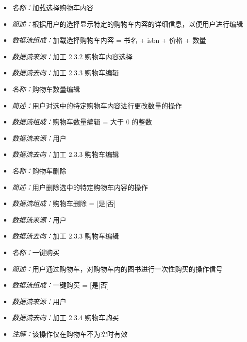 \vspace{-1mm}

\begin{itemize}
	\item \textit{名称：}加载选择购物车内容
	\item \textit{简述：}根据用户的选择显示特定的购物车内容的详细信息，以便用户进行编辑
	\item \textit{数据流组成：}加载选择购物车内容 = 书名 + isbn + 价格 + 数量
	\item \textit{数据流来源：}加工 2.3.2 购物车内容选择
	\item \textit{数据流去向：}加工 2.3.3 购物车编辑
\end{itemize}

\vspace{-1mm}

\begin{itemize}
	\item \textit{名称：}购物车数量编辑
	\item \textit{简述：}用户对选中的特定购物车内容进行更改数量的操作
	\item \textit{数据流组成：}购物车数量编辑 = 大于 0 的整数
	\item \textit{数据流来源：}用户
	\item \textit{数据流去向：}加工 2.3.3 购物车编辑
\end{itemize}

\vspace{-1mm}

\begin{itemize}
	\item \textit{名称：}购物车删除
	\item \textit{简述：}用户删除选中的特定购物车内容的操作
	\item \textit{数据流组成：}购物车删除 = [是|否]
	\item \textit{数据流来源：}用户
	\item \textit{数据流去向：}加工 2.3.3 购物车编辑
\end{itemize}

\vspace{-1mm}

\begin{itemize}
	\item \textit{名称：}一键购买
	\item \textit{简述：}用户通过购物车，对购物车内的图书进行一次性购买的操作信号
	\item \textit{数据流组成：}一键购买 = [是|否]
	\item \textit{数据流来源：}用户
	\item \textit{数据流去向：}加工 2.3.4 购物车购买
	\item \textit{注解：}该操作仅在购物车不为空时有效
\end{itemize}

